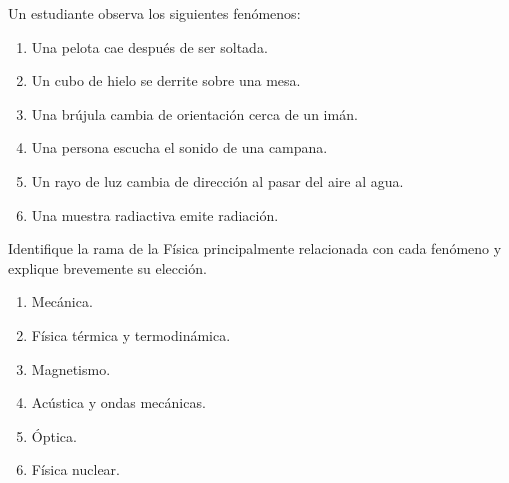 ﻿\nivelbasico

\begin{ejercicio}
Un estudiante observa los siguientes fenómenos:

\begin{enumerate}[label=\alph*)]
    \item Una pelota cae después de ser soltada.
    \item Un cubo de hielo se derrite sobre una mesa.
    \item Una brújula cambia de orientación cerca de un imán.
    \item Una persona escucha el sonido de una campana.
    \item Un rayo de luz cambia de dirección al pasar del aire al agua.
    \item Una muestra radiactiva emite radiación.
\end{enumerate}

Identifique la rama de la Física principalmente relacionada con cada fenómeno y explique brevemente su elección.
\end{ejercicio}

\begin{respuesta}
\begin{enumerate}[label=\alph*)]
    \item Mecánica.
    \item Física térmica y termodinámica.
    \item Magnetismo.
    \item Acústica y ondas mecánicas.
    \item Óptica.
    \item Física nuclear.
\end{enumerate}
\end{respuesta}

